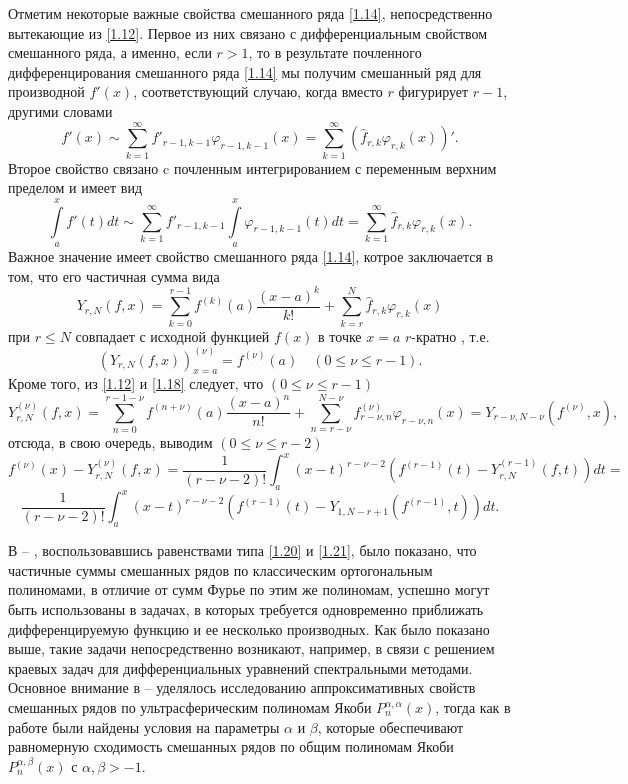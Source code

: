 Отметим некоторые важные свойства смешанного ряда \eqref{1.14}, непосредственно вытекающие из \eqref{1.12}. Первое из них связано с дифференциальным свойством смешанного ряда, а именно, если $r>1$, то в результате почленного дифференцирования смешанного ряда \eqref{1.14} мы получим смешанный ряд для производной $f'(x)$, соответствующий случаю, когда вместо $r$ фигурирует $r-1$, другими словами
\begin{equation}\label{1.16}
f'(x)\sim  \sum_{k=1}^\infty f'_{r-1,k-1}\varphi_{r-1,k-1}(x)=\sum_{k=1}^\infty (\hat f_{r,k}\varphi_{r,k}(x))'.
\end{equation}
Второе свойство связано c почленным интегрированием с переменным верхним пределом и имеет вид
\begin{equation}\label{1.17}
\int\limits_a^xf'(t)dt\sim \sum_{k=1}^\infty f'_{r-1,k-1}\int\limits_a^x\varphi_{r-1,k-1}(t)dt=\sum_{k=1}^\infty \hat f_{r,k}\varphi_{r,k}(x).
\end{equation}
Важное значение имеет свойство  смешанного ряда \eqref{1.14}, котрое заключается в том, что его частичная сумма вида
\begin{equation}\label{1.18}
Y_{r,N}(f,x)=\sum_{k=0}^{r-1} f^{(k)}(a)\frac{(x-a)^k}{k!}+ \sum_{k=r}^{N} \hat f_{r,k}\varphi_{r,k}(x)
\end{equation}
 при   $r\le N$  совпадает с исходной функцией $f(x)$   в точке $x=a$ $r$-кратно , т.е.
\begin{equation}\label{1.19}
(Y_{r,N}(f,x))^{(\nu)}_{x=a}=f^{(\nu)}(a)\quad (0\le\nu\le r-1).
\end{equation}
Кроме того, из \eqref{1.12} и \eqref{1.18} следует, что $(0\le\nu\le r-1)$
\begin{equation}\label{1.20}
 Y_{r,N}^{(\nu)}(f,x)=\sum_{n=0}^{r-1-\nu} f^{(n+\nu)}(a)\frac{(x-a)^n}{n!}+ \sum_{n=r-\nu}^{N-\nu} f_{r-\nu,n}^{(\nu)}\varphi_{r-\nu,n}(x)=Y_{r-\nu,N-\nu}(f^{(\nu)},x),
 \end{equation}
отсюда, в свою очередь, выводим $(0\le\nu\le r-2)$
 $$
f^{(\nu)}(x)-Y_{r,N}^{(\nu)}(f,x)= \frac{1}{(r-\nu-2)!}\int_a^x (x-t)^{r-\nu-2}(f^{(r-1)}(t)-Y_{r,N}^{(r-1)}(f,t))dt=
$$
  \begin{equation}\label{1.21}
\frac{1}{(r-\nu-2)!}\int_a^x (x-t)^{r-\nu-2}(f^{(r-1)}(t)-Y_{1,N-r+1}(f^{(r-1)},t))dt.
 \end{equation}


  В \cite{Shar11} -- \cite{Shar18}, воспользовавшись равенствами типа \eqref{1.20} и \eqref{1.21}, было показано, что частичные суммы смешанных рядов по классическим ортогональным полиномами, в отличие от сумм Фурье по этим же полиномам, успешно могут быть использованы в задачах, в которых требуется одновременно приближать дифференцируемую функцию и ее несколько производных. Как было показано выше, такие задачи непосредственно возникают, например, в связи с решением краевых задач для дифференциальных уравнений спектральными методами.  Основное внимание  в \cite{Shar11} -- \cite{Shar16}  уделялось исследованию аппроксимативных свойств смешанных рядов по ультрасферическим полиномам Якоби  $P_n^{\alpha,\alpha}(x)$, тогда как в работе \cite{Shar18} были найдены условия на параметры $\alpha$ и $\beta$, которые обеспечивают равномерную сходимость смешанных рядов по общим полиномам Якоби $P_n^{\alpha,\beta}(x)$ с $\alpha,\beta>-1$.

